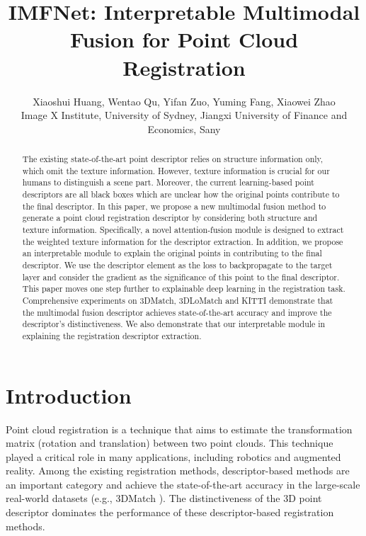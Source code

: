 \documentclass[10pt,twocolumn,letterpaper]{article}
\begin{document}
	
\title{IMFNet: Interpretable Multimodal Fusion for Point Cloud Registration}
	
	\author{Xiaoshui Huang, Wentao Qu, Yifan Zuo, Yuming Fang, Xiaowei Zhao \\
		 Image X Institute, University of Sydney,
		 Jiangxi University of Finance and Economics,
		 Sany
}
\maketitle
\begin{abstract}
	The existing state-of-the-art point descriptor relies on structure information only, which omit the texture information. However, texture information is crucial for our humans to distinguish a scene part. Moreover, the current learning-based point descriptors are all black boxes which are unclear how the original points contribute to the final descriptor. In this paper, we propose a new multimodal fusion method to generate a point cloud registration descriptor by considering both structure and texture information. Specifically, a novel attention-fusion module is designed to extract the weighted texture information for the descriptor extraction. In addition, we propose an interpretable module to explain the original points in contributing to the final descriptor. We use the descriptor element as the loss to backpropagate to the target layer and consider the gradient as the significance of this point to the final descriptor. This paper moves one step further to explainable deep learning in the registration task. Comprehensive experiments on 3DMatch, 3DLoMatch and KITTI demonstrate that the multimodal fusion descriptor achieves state-of-the-art accuracy and improve the descriptor's distinctiveness. We also demonstrate that our interpretable module in explaining the registration descriptor extraction.
\end{abstract}

\section{Introduction}
\label{sec:intro}
Point cloud registration is a technique that aims to estimate the transformation matrix (rotation and translation) between two point clouds. This technique played a critical role in many applications, including robotics and augmented reality\cite{huang2021comprehensive}. Among the existing registration methods\cite{choy2019fully,huang2021predator,ao2021spinnet,huang2020feature,horache20213d}, descriptor-based methods \cite{ao2021spinnet,horache20213d} are an important category and achieve the state-of-the-art accuracy in the large-scale real-world datasets (e.g., 3DMatch \cite{zeng20173dmatch}). The distinctiveness of the 3D point descriptor dominates the performance of these descriptor-based registration methods. 
\end{document}
